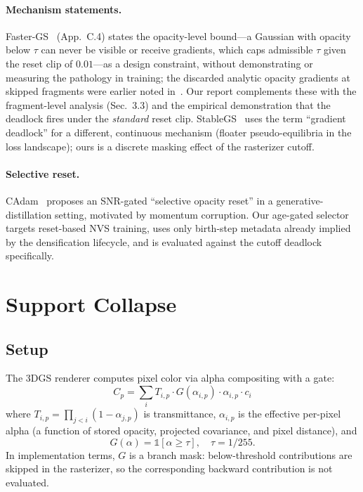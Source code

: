 \documentclass[runningheads]{llncs}
\begin{document}
\paragraph{Mechanism statements.} Faster-GS~\cite{fastergs2026} (App.~C.4) states the opacity-level bound---a Gaussian with opacity below $\tau$ can never be visible or receive gradients, which caps admissible $\tau$ given the reset clip of $0.01$---as a design constraint, without demonstrating or measuring the pathology in training; the discarded analytic opacity gradients at skipped fragments were earlier noted in~\cite{bagoftricks2025}. Our report complements these with the fragment-level analysis (Sec.~3.3) and the empirical demonstration that the deadlock fires under the \emph{standard} reset clip. StableGS~\cite{stablegs2025} uses the term ``gradient deadlock'' for a different, continuous mechanism (floater pseudo-equilibria in the loss landscape); ours is a discrete masking effect of the rasterizer cutoff.

\paragraph{Selective reset.} CAdam~\cite{cadam2026} proposes an SNR-gated ``selective opacity reset'' in a generative-distillation setting, motivated by momentum corruption. Our age-gated selector targets reset-based NVS training, uses only birth-step metadata already implied by the densification lifecycle, and is evaluated against the cutoff deadlock specifically.

\section{Support Collapse}

\subsection{Setup}

The 3DGS renderer computes pixel color via alpha compositing with a gate:
\begin{equation}
C_p = \sum_i T_{i,p} \cdot G(\alpha_{i,p}) \cdot \alpha_{i,p} \cdot c_i
\end{equation}
where $T_{i,p} = \prod_{j<i}(1-\alpha_{j,p})$ is transmittance, $\alpha_{i,p}$ is the effective per-pixel alpha (a function of stored opacity, projected covariance, and pixel distance), and
\begin{equation}
G(\alpha) = \mathbb{1}[\alpha \geq \tau], \quad \tau = 1/255.
\end{equation}
In implementation terms, $G$ is a branch mask: below-threshold contributions are skipped in the rasterizer, so the corresponding backward contribution is not evaluated.
\end{document}
